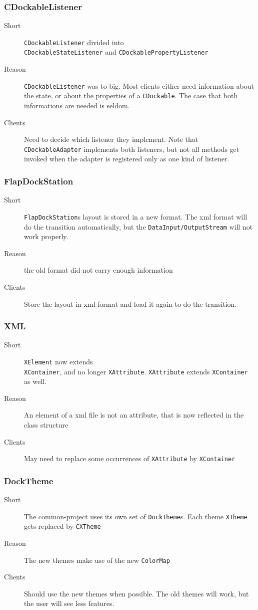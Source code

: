 \documentclass[a4paper,10pt]{article}
\newcommand{\src}[1]{\lstinline[basicstyle=\normalsize\ttfamily,keywordstyle=\normalsize\ttfamily,identifierstyle=\normalsize\ttfamily]|#1|}
\newcommand{\short}{\item[Short]}
\newcommand{\why}{\item[Reason]}
\newcommand{\clients}{\item[Clients]}
\begin{document}
\subsubsection{CDockableListener}
\begin{description}
 \short \src{CDockableListener} divided into \\\src{CDockableStateListener} and \src{CDockablePropertyListener}
 \why \src{CDockableListener} was to big. Most clients either need information about the state, or about the properties of a \src{CDockable}. The case that both informations are needed is seldom.
 \clients Need to decide which listener they implement. Note that \\\src{CDockableAdapter} implements both listeners, but not all methods get invoked when the adapter is registered only as one kind of listener.
\end{description}

\subsubsection{FlapDockStation}
\begin{description}
 \short \src{FlapDockStation}s layout is stored in a new format. The xml format will do the transition automatically, but the \src{DataInput/OutputStream} will not work properly.
 \why the old format did not carry enough information
 \clients Store the layout in xml-format and load it again to do the transition.
\end{description}

\subsubsection{XML}
\begin{description}
 \short \src{XElement} now extends \\\src{XContainer}, and no longer \src{XAttribute}. \src{XAttribute} extends \src{XContainer} as well.
 \why An element of a xml file is not an attribute, that is now reflected in the class structure
 \clients May need to replace some occurrences of \src{XAttribute} by \src{XContainer}
\end{description}

\subsubsection{DockTheme}
\begin{description}
 \short The common-project uses its own set of \src{DockTheme}s. Each theme \src{XTheme} gets replaced by \src{CXTheme}
 \why The new themes make use of the new \src{ColorMap}
 \clients Should use the new themes when possible. The old themes will work, but the user will see less features.
\end{description}
\end{document}
